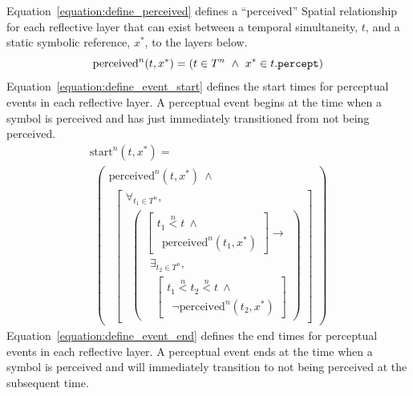 {\mbox{Equation~\ref{equation:define_perceived}}} defines a
``perceived'' Spatial relationship for each reflective layer that can
exist between a temporal simultaneity, $t$, and a static symbolic
reference, $x^*$, to the layers below.
\begin{equation}
\label{equation:define_perceived}
\text{perceived}^n(t, x^*) = (t \in T^n ~\wedge~ x^* \in t.\text{\tt{percept}})
\end{equation}
{\mbox{Equation~\ref{equation:define_event_start}}} defines the start
times for perceptual events in each reflective layer.  A perceptual
event begins at the time when a symbol is perceived and has just
immediately transitioned from not being perceived.
\begin{equation}
\label{equation:define_event_start}
\begin{array}{l}
  \text{start}^n(t, x^*) = \\
  ~~\left(
  \begin{array}{l}
  \text{perceived}^n(t, x^*) ~\wedge~ \\
  ~~\left[
  \begin{array}{l}
  \forall_{t_1 \in T^n}, \\
  ~~\left(\begin{array}{l}
            \left[\begin{array}{l}
                    t_1 \stackrel{n}{<} t ~\wedge~ \\
                    ~~\text{perceived}^n(t_1, x^*)\end{array}\right] \longrightarrow \\
            ~~\exists_{t_2 \in T^n}, \\
            ~~~~\left[\begin{array}{l}
                        t_1 \stackrel{n}{<} t_2 \stackrel{n}{<} t ~\wedge~ \\
                        ~~\neg\text{perceived}^n(t_2, x^*)\end{array}\right]\end{array}\right)
  \end{array}
  \right]
  \end{array}\right)
\end{array}
\end{equation}
{\mbox{Equation~\ref{equation:define_event_end}}} defines the end
times for perceptual events in each reflective layer.  A perceptual
event ends at the time when a symbol is perceived and will immediately
transition to not being perceived at the subsequent time.
